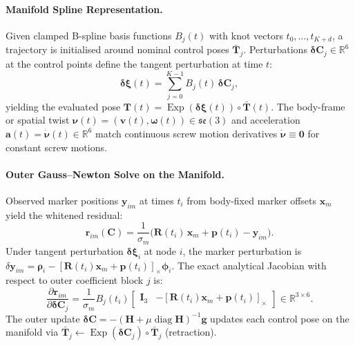 \documentclass[11pt,a4paper]{article}
\begin{document}
\paragraph{Manifold Spline Representation.}
Given clamped B-spline basis functions $B_j(t)$ with knot vectors $t_0,\dots,t_{K+d}$, a trajectory is initialised around nominal control poses $\bar{\mathbf{T}}_j$. Perturbations $\boldsymbol{\delta}\mathbf{C}_j \in \mathbb{R}^6$ at the control points define the tangent perturbation at time $t$:
\begin{equation}
  \boldsymbol{\delta\xi}(t) = \sum_{j=0}^{K-1} B_j(t)\,\boldsymbol{\delta}\mathbf{C}_j,
\end{equation}
yielding the evaluated pose $\mathbf{T}(t) = \operatorname{Exp}(\boldsymbol{\delta\xi}(t)) \circ \bar{\mathbf{T}}(t)$. The body-frame or spatial twist $\boldsymbol{\nu}(t) = (\mathbf{v}(t), \boldsymbol{\omega}(t)) \in \mathfrak{se}(3)$ and acceleration $\mathbf{a}(t) = \dot{\boldsymbol{\nu}}(t) \in \mathbb{R}^6$ match continuous screw motion derivatives $\dot{\boldsymbol{\nu}}\equiv\mathbf{0}$ for constant screw motions.

\paragraph{Outer Gauss--Newton Solve on the Manifold.}
Observed marker positions $\mathbf{y}_{im}$ at times $t_i$ from body-fixed marker offsets $\mathbf{x}_m$ yield the whitened residual:
\begin{equation}
  \mathbf{r}_{im}(\mathbf{C}) = \frac{1}{\sigma_m} \big(\mathbf{R}(t_i)\,\mathbf{x}_m + \mathbf{p}(t_i) - \mathbf{y}_{im}\big).
\end{equation}
Under tangent perturbation $\boldsymbol{\delta\xi}_i$ at node $i$, the marker perturbation is $\delta \mathbf{y}_{im} = \boldsymbol{\rho}_i - [\mathbf{R}(t_i)\mathbf{x}_m + \mathbf{p}(t_i)]_\times \boldsymbol{\phi}_i$. The exact analytical Jacobian with respect to outer coefficient block $j$ is:
\begin{equation}
  \frac{\partial \mathbf{r}_{im}}{\partial \boldsymbol{\delta}\mathbf{C}_j} = \frac{1}{\sigma_m} B_j(t_i) \begin{bmatrix} \mathbf{I}_3 & -[\mathbf{R}(t_i)\mathbf{x}_m + \mathbf{p}(t_i)]_\times \end{bmatrix} \in \mathbb{R}^{3\times 6}.
  \label{eq:marker_jacobian}
\end{equation}
The outer update $\boldsymbol{\delta}\mathbf{C} = -(\mathbf{H} + \mu \operatorname{diag}\mathbf{H})^{-1} \mathbf{g}$ updates each control pose on the manifold via $\bar{\mathbf{T}}_j \leftarrow \operatorname{Exp}(\boldsymbol{\delta}\mathbf{C}_j) \circ \bar{\mathbf{T}}_j$ (retraction).
\end{document}
